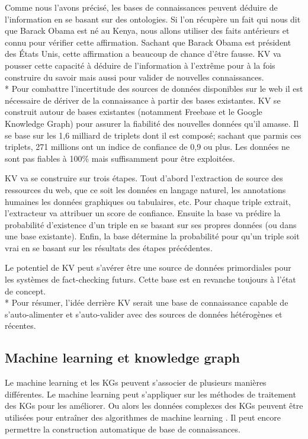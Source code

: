 Comme nous l'avons précisé, les bases de connaissances peuvent déduire de l'information en se basant sur des ontologies. Si l'on récupère un fait qui nous dit que Barack Obama est né au Kenya, nous allons utiliser des faits antérieurs et connu pour vérifier cette affirmation. Sachant que Barack Obama est président des États Unis, cette affirmation a beaucoup de chance d'être fausse. KV va pousser cette capacité à déduire de l'information à l'extrême pour à la fois construire du savoir mais aussi pour valider de nouvelles connaissances.
\\*
Pour combattre l'incertitude des sources de données disponibles sur le web il est nécessaire de dériver de la connaissance à partir des bases existantes. KV se construit autour de bases existantes (notamment Freebase et le Google Knowledge Graph) pour assurer la fiabilité des nouvelles données qu'il amasse. Il se base sur les 1,6 milliard de triplets dont il est composé; sachant que parmis ces triplets, 271 millions ont un indice de confiance de 0,9 ou plus. Les données ne sont pas fiables à 100\% mais suffisamment pour être exploitées.

KV va se construire sur trois étapes. Tout d'abord l'extraction de source des ressources du web, que ce soit les données en langage naturel, les annotations humaines les données graphiques ou tabulaires, etc. Pour chaque triple extrait, l'extracteur va attribuer un score de confiance. Ensuite la base va prédire la probabilité d'existence d'un triple en se basant sur ses propres données (ou dans une base existante). Enfin, la base détermine la probabilité pour qu'un triple soit vrai en se basant sur les résultats des étapes précédentes.

Le potentiel de KV peut s'avérer être une source de données primordiales pour les systèmes de fact-checking futurs. Cette base est en revanche toujours à l'état de concept.
\\*
Pour résumer, l'idée derrière KV serait une base de connaissance capable de s'auto-alimenter et s'auto-valider avec des sources de données hétérogènes et récentes.

\subsection{Machine learning et knowledge graph}

Le machine learning et les KGs peuvent s'associer de plusieurs manières différentes. Le machine learning peut s'appliquer sur les méthodes de traitement des KGs pour les améliorer. Ou alors les données complexes des KGs peuvent être utilisées pour entraîner des algorithmes de machine learning \cite{wilcke2017knowledge}. Il peut encore permettre la construction automatique de base de connaissances.


